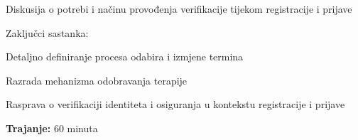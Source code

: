 \begin{packed_enum}
\begin{packed_item}
\begin{packed_item}
\begin{packed_item}
                                \item Diskusija o potrebi i načinu provođenja verifikacije tijekom registracije i prijave
                            \end{packed_item}
                    \end{packed_item}
                \item Zaključci sastanka:
                    \begin{packed_item}
                        \item Detaljno definiranje procesa odabira i izmjene termina
                        \item Razrada mehanizma odobravanja terapije
                        \item Rasprava o verifikaciji identiteta i osiguranja u kontekstu registracije i prijave
                    \end{packed_item}
                \item \textbf{Trajanje:} 60 minuta
            \end{packed_item}
        
\vspace{30pt}



\end{packed_enum}
